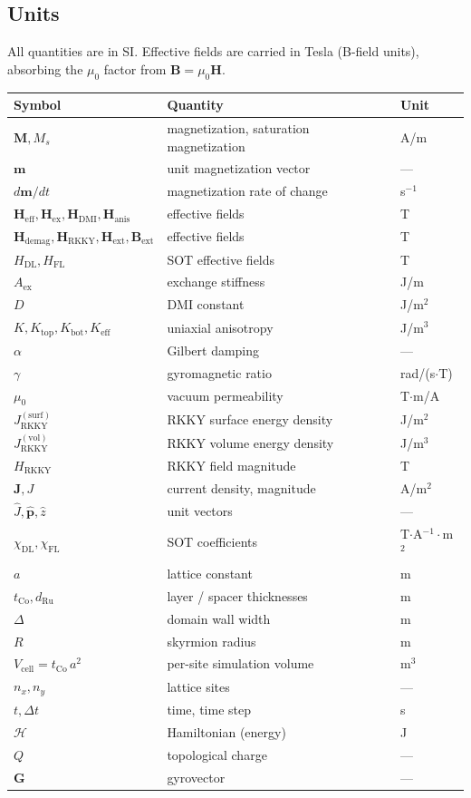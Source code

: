 \documentclass[11pt,a4paper]{article}
\newcommand{\mb}[1]{\mathbf{#1}}
\newcommand{\phat}{\hat{\mb{p}}}
\newcommand{\zhat}{\hat{z}}
\newcommand{\Heff}{\mb{H}_{\text{eff}}}
\newcommand{\Hex}{\mb{H}_{\text{ex}}}
\newcommand{\Hdmi}{\mb{H}_{\text{DMI}}}
\newcommand{\Hanis}{\mb{H}_{\text{anis}}}
\newcommand{\Hdemag}{\mb{H}_{\text{demag}}}
\newcommand{\Hrkky}{\mb{H}_{\text{RKKY}}}
\newcommand{\Hext}{\mb{H}_{\text{ext}}}
\newcommand{\tCo}{t_{\text{Co}}}
\newcommand{\Keff}{K_{\text{eff}}}
\newcommand{\Aex}{A_{\text{ex}}}
\newcommand{\Ms}{M_s}
\begin{document}
\subsection{Units}
\label{sec:units}

All quantities are in SI. Effective fields are carried in Tesla
(B-field units), absorbing the $\mu_0$ factor from
$\mb{B} = \mu_0\mb{H}$.

\begin{table}[h!]
\centering
\begin{tabular}{@{}lll@{}}
\toprule
Symbol & Quantity & Unit \\
\midrule
$\mb{M}, \Ms$ & magnetization, saturation magnetization & A/m \\
$\mb{m}$ & unit magnetization vector & --- \\
$d\mb{m}/dt$ & magnetization rate of change & s$^{-1}$ \\
$\Heff, \Hex, \Hdmi, \Hanis$ & effective fields & T \\
$\Hdemag, \Hrkky, \Hext, \mb{B}_{\text{ext}}$ & effective fields & T \\
$H_{\text{DL}}, H_{\text{FL}}$ & SOT effective fields & T \\
$\Aex$ & exchange stiffness & J/m \\
$D$ & DMI constant & J/m$^2$ \\
$K, K_{\text{top}}, K_{\text{bot}}, \Keff$ & uniaxial anisotropy
    & J/m$^3$ \\
$\alpha$ & Gilbert damping & --- \\
$\gamma$ & gyromagnetic ratio & rad/(s$\cdot$T) \\
$\mu_0$ & vacuum permeability & T$\cdot$m/A \\
$J_{\text{RKKY}}^{(\text{surf})}$ & RKKY surface energy density
    & J/m$^2$ \\
$J_{\text{RKKY}}^{(\text{vol})}$ & RKKY volume energy density
    & J/m$^3$ \\
$H_{\text{RKKY}}$ & RKKY field magnitude & T \\
$\mb{J}, J$ & current density, magnitude & A/m$^2$ \\
$\hat{J}, \phat, \zhat$ & unit vectors & --- \\
$\chi_{\text{DL}}, \chi_{\text{FL}}$ & SOT coefficients
    & T$\cdot$A$^{-1}\cdot$m$^2$ \\
$a$ & lattice constant & m \\
$\tCo, d_{\text{Ru}}$ & layer / spacer thicknesses & m \\
$\Delta$ & domain wall width & m \\
$R$ & skyrmion radius & m \\
$V_{\text{cell}} = \tCo\,a^2$ & per-site simulation volume & m$^3$ \\
$n_x, n_y$ & lattice sites & --- \\
$t, \Delta t$ & time, time step & s \\
$\mathcal{H}$ & Hamiltonian (energy) & J \\
$Q$ & topological charge & --- \\
$\mb{G}$ & gyrovector & --- \\
\bottomrule
\end{tabular}
\end{table}
\end{document}
